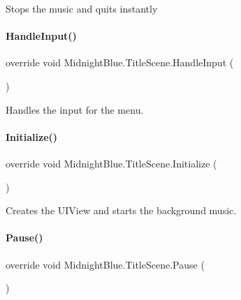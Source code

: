 Stops the music and quits instantly 

\hypertarget{class_midnight_blue_1_1_title_scene_a54dc02f150eb90dac2fcc6e37a077723}{}\label{class_midnight_blue_1_1_title_scene_a54dc02f150eb90dac2fcc6e37a077723} 
\paragraph{\texorpdfstring{Handle\+Input()}{HandleInput()}}
{\footnotesize\ttfamily override void Midnight\+Blue.\+Title\+Scene.\+Handle\+Input (\begin{DoxyParamCaption}{ }\end{DoxyParamCaption})\hspace{0.3cm}{\ttfamily [inline]}}



Handles the input for the menu. 

\hypertarget{class_midnight_blue_1_1_title_scene_a793aa8253fba8d62a4ee19f042b22891}{}\label{class_midnight_blue_1_1_title_scene_a793aa8253fba8d62a4ee19f042b22891} 
\paragraph{\texorpdfstring{Initialize()}{Initialize()}}
{\footnotesize\ttfamily override void Midnight\+Blue.\+Title\+Scene.\+Initialize (\begin{DoxyParamCaption}{ }\end{DoxyParamCaption})\hspace{0.3cm}{\ttfamily [inline]}}



Creates the U\+I\+View and starts the background music. 

\hypertarget{class_midnight_blue_1_1_title_scene_a046934bfa3290d443b58bcc1de0919db}{}\label{class_midnight_blue_1_1_title_scene_a046934bfa3290d443b58bcc1de0919db} 
\paragraph{\texorpdfstring{Pause()}{Pause()}}
{\footnotesize\ttfamily override void Midnight\+Blue.\+Title\+Scene.\+Pause (\begin{DoxyParamCaption}{ }\end{DoxyParamCaption})\hspace{0.3cm}{\ttfamily [inline]}}



